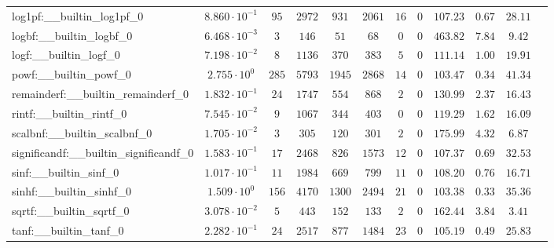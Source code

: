 \begin{tabular}{|l|c|c|c|c|c|c|c|c|c|c|c|}
log1pf:\_\_builtin\_log1pf\_0             & $ 8.860 \cdot 10^{-1} $ & $ 95     $ & $ 2972  $ & $ 931   $ & $ 2061  $ & $ 16  $ & $ 0 $ & $ 107.23      $ & $ 0.67    $ & $ 28.11   $ \\
logbf:\_\_builtin\_logbf\_0               & $ 6.468 \cdot 10^{-3} $ & $ 3      $ & $ 146   $ & $ 51    $ & $ 68    $ & $ 0   $ & $ 0 $ & $ 463.82      $ & $ 7.84    $ & $ 9.42    $ \\
logf:\_\_builtin\_logf\_0                 & $ 7.198 \cdot 10^{-2} $ & $ 8      $ & $ 1136  $ & $ 370   $ & $ 383   $ & $ 5   $ & $ 0 $ & $ 111.14      $ & $ 1.00    $ & $ 19.91   $ \\
powf:\_\_builtin\_powf\_0                 & $ 2.755 \cdot 10^{0}  $ & $ 285    $ & $ 5793  $ & $ 1945  $ & $ 2868  $ & $ 14  $ & $ 0 $ & $ 103.47      $ & $ 0.34    $ & $ 41.34   $ \\
remainderf:\_\_builtin\_remainderf\_0     & $ 1.832 \cdot 10^{-1} $ & $ 24     $ & $ 1747  $ & $ 554   $ & $ 868   $ & $ 2   $ & $ 0 $ & $ 130.99      $ & $ 2.37    $ & $ 16.43   $ \\
rintf:\_\_builtin\_rintf\_0               & $ 7.545 \cdot 10^{-2} $ & $ 9      $ & $ 1067  $ & $ 344   $ & $ 403   $ & $ 0   $ & $ 0 $ & $ 119.29      $ & $ 1.62    $ & $ 16.09   $ \\
scalbnf:\_\_builtin\_scalbnf\_0           & $ 1.705 \cdot 10^{-2} $ & $ 3      $ & $ 305   $ & $ 120   $ & $ 301   $ & $ 2   $ & $ 0 $ & $ 175.99      $ & $ 4.32    $ & $ 6.87    $ \\
significandf:\_\_builtin\_significandf\_0 & $ 1.583 \cdot 10^{-1} $ & $ 17     $ & $ 2468  $ & $ 826   $ & $ 1573  $ & $ 12  $ & $ 0 $ & $ 107.37      $ & $ 0.69    $ & $ 32.53   $ \\
sinf:\_\_builtin\_sinf\_0                 & $ 1.017 \cdot 10^{-1} $ & $ 11     $ & $ 1984  $ & $ 669   $ & $ 799   $ & $ 11  $ & $ 0 $ & $ 108.20      $ & $ 0.76    $ & $ 16.71   $ \\
sinhf:\_\_builtin\_sinhf\_0               & $ 1.509 \cdot 10^{0}  $ & $ 156    $ & $ 4170  $ & $ 1300  $ & $ 2494  $ & $ 21  $ & $ 0 $ & $ 103.38      $ & $ 0.33    $ & $ 35.36   $ \\
sqrtf:\_\_builtin\_sqrtf\_0               & $ 3.078 \cdot 10^{-2} $ & $ 5      $ & $ 443   $ & $ 152   $ & $ 133   $ & $ 2   $ & $ 0 $ & $ 162.44      $ & $ 3.84    $ & $ 3.41    $ \\
tanf:\_\_builtin\_tanf\_0                 & $ 2.282 \cdot 10^{-1} $ & $ 24     $ & $ 2517  $ & $ 877   $ & $ 1484  $ & $ 23  $ & $ 0 $ & $ 105.19      $ & $ 0.49    $ & $ 25.83   $ \\

\end{tabular}
